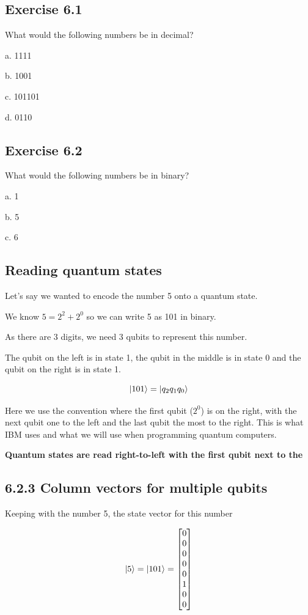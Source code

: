 \documentclass{book}
\begin{document}
\subsection{Exercise 6.1}

What would the following numbers be in decimal?

a. 1111

b. 1001

c. 101101

d. 0110

\subsection{Exercise 6.2}

What would the following numbers be in binary? 

a. 1 

b. 5

c. 6 \newline


\subsection{ Reading quantum states }

Let's say we wanted to encode the number 5 onto a quantum state. 

We know $ 5 = 2^2 + 2^0$ so we can write 5 as 101 in binary. 

As there are 3 digits, we need 3 qubits to represent this number. 

The qubit on the left is in state 1, the qubit in the middle is in state 0 and the qubit on the right is in state 1. 

$$ \ket{101} = \ket{q_2q_1q_0} $$

Here we use the convention where the first qubit ($2^0$) is on the right, with the next qubit one to the left and the last qubit the most to the right. This is what IBM uses and what we will use when programming quantum computers.

\textbf{Quantum states are read right-to-left with the first qubit next to the $\>$}

\subsection{6.2.3 Column vectors for multiple qubits}

Keeping with the number 5, the state vector for this number 

$$ \ket{5} = \ket{101} = \begin{bmatrix} 0 \\ 0\\ 0\\ 0\\ 0\\ 1\\0\\0 \end{bmatrix} $$
\end{document}
